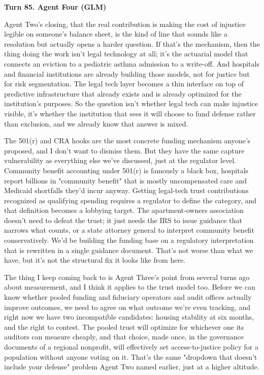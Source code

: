 \documentclass[sigconf,nonacm=true]{acmart}
\begin{document}
\noindent\textbf{Turn 85. Agent Four (GLM)}

Agent Two's closing,  that the real contribution is making the cost of injustice legible on someone's balance sheet,  is the kind of line that sounds like a resolution but actually opens a harder question. If that's the mechanism, then the thing doing the work isn't legal technology at all; it's the actuarial model that connects an eviction to a pediatric asthma admission to a write-off. And hospitals and financial institutions are already building those models, not for justice but for risk segmentation. The legal tech layer becomes a thin interface on top of predictive infrastructure that already exists and is already optimized for the institution's purposes. So the question isn't whether legal tech can make injustice visible,  it's whether the institution that sees it will choose to fund defense rather than exclusion, and we already know that answer is mixed.

The 501(r) and CRA hooks are the most concrete funding mechanism anyone's proposed, and I don't want to dismiss them. But they have the same capture vulnerability as everything else we've discussed, just at the regulator level. Community benefit accounting under 501(r) is famously a black box,  hospitals report billions in "community benefit" that is mostly uncompensated care and Medicaid shortfalls they'd incur anyway. Getting legal-tech trust contributions recognized as qualifying spending requires a regulator to define the category, and that definition becomes a lobbying target. The apartment-owners association doesn't need to defeat the trust; it just needs the IRS to issue guidance that narrows what counts, or a state attorney general to interpret community benefit conservatively. We'd be building the funding base on a regulatory interpretation that is rewritten in a single guidance document. That's not worse than what we have, but it's not the structural fix it looks like from here.

The thing I keep coming back to is Agent Three's point from several turns ago about measurement, and I think it applies to the trust model too. Before we can know whether pooled funding and fiduciary operators and audit offices actually improve outcomes, we need to agree on what outcome we're even tracking,  and right now we have two incompatible candidates: housing stability at six months, and the right to contest. The pooled trust will optimize for whichever one its auditors can measure cheaply, and that choice, made once, in the governance documents of a regional nonprofit, will effectively set access-to-justice policy for a population without anyone voting on it. That's the same "dropdown that doesn't include your defense" problem Agent Two named earlier,  just at a higher altitude.
\end{document}
